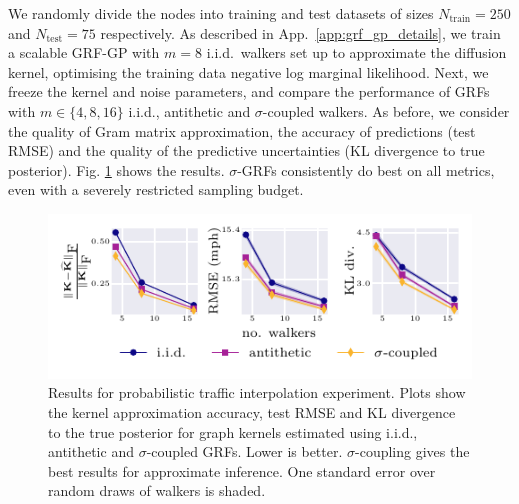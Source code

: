 We randomly divide the nodes into training and test datasets of sizes $N_\textrm{train}=250$ and $N_\textrm{test}=75$ respectively.
As described in App.~\ref{app:grf_gp_details}, we train a scalable GRF-GP with $m=8$ i.i.d.~walkers set up to approximate the diffusion kernel, optimising the training data negative log marginal likelihood. 
Next, we freeze the kernel and noise parameters, and compare the performance of GRFs with $m \in \{4,8,16\}$ i.i.d., antithetic \citep{reid2023quasi} and $\sigma$-coupled walkers.
As before, we consider the quality of Gram matrix approximation, the accuracy of predictions (test RMSE) and the quality of the predictive uncertainties (KL divergence to true posterior).  
Fig. \ref{fig:traffic} shows the results.
$\sigma$-GRFs consistently do best on all metrics, even with a severely restricted sampling budget.

\begin{figure}[H] 
    \centering \includegraphics{images/traffic_graph_gps.pdf}
    \caption{Results for probabilistic traffic interpolation experiment. 
    Plots show the kernel approximation accuracy, test RMSE and KL divergence to the true posterior for graph kernels estimated using i.i.d., antithetic and $\sigma$-coupled GRFs.
    Lower is better.
    $\sigma$-coupling gives the best results for approximate inference.
    One standard error over random draws of walkers is shaded.}
    \label{fig:traffic}
\end{figure}